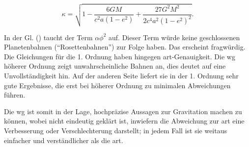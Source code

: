 \begin{equation}
\kappa = \sqrt{1 - \frac{6GM}{c^2 a(1 - e^2)} + \frac{27G^2 M^2}{2c^4 a^2 (1 - e^2)^2}}.
\end{equation}

In der Gl. () taucht der Term $\alpha \phi^2$ auf. Dieser Term würde keine geschlossenen Planetenbahnen (\enquote{Rosettenbahnen}) zur Folge haben.
Das erscheint fragwürdig. Die Gleichungen für die 1. Ordnung haben hingegen \gls{art}-Genauigkeit. Die \gls{wg} höherer Ordnung zeigt unwahrscheinliche Bahnen an, dies deutet
auf eine Unvollständigkeit hin. Auf der anderen Seite liefert sie in der 1. Ordnung sehr gute Ergebnisse, die erst bei höherer Ordnung zu minimalen Abweichungen führen.

Die \gls{wg} ist somit in der Lage, hochpräzise Aussagen zur Gravitation machen zu können, wobei nicht eindeutig geklärt ist, inwiefern die Abweichung zur \gls{art} eine
Verbesserung oder Verschlechterung darstellt; in jedem Fall ist sie weitaus einfacher und verständlicher als die \gls{art}.

